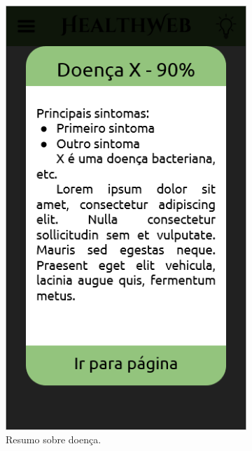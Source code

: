 \begin{figure}[htbp]
\begin{subfigure}{0.24\linewidth}
		\includegraphics[width=\linewidth]{figure/prototype/mobile/this_disease.png}
		\caption{Resumo sobre doença.}
		\label{fig:mobile:this_disease}
	\end{subfigure}
	\hfill
	\begin{subfigure}{0.24\linewidth}
		\centering

\end{subfigure}
\end{figure}
